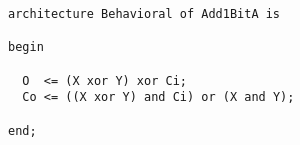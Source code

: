 \begin{verbatim}
architecture Behavioral of Add1BitA is

begin

  O  <= (X xor Y) xor Ci;
  Co <= ((X xor Y) and Ci) or (X and Y);

end;
\end{verbatim}
